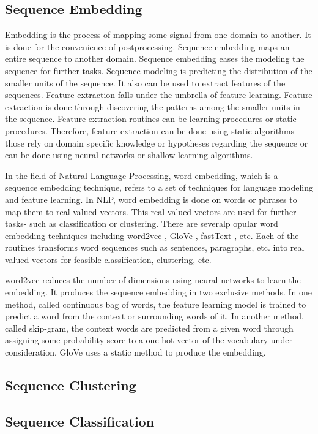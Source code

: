 \documentclass[oneside, twocolumn, a4paper, 10pt]{IEEEtran}
\begin{document}
\subsection{Sequence Embedding}
Embedding is the process of mapping some signal from one domain to another. It is done for the convenience of postprocessing. Sequence embedding maps an entire sequence to another domain. Sequence embedding eases the modeling the sequence for further tasks. Sequence modeling is predicting the distribution of the smaller units of the sequence. It also can be used to extract features of the sequences. Feature extraction falls under the umbrella of feature learning. Feature extraction is done through discovering the patterns among the smaller units in the sequence. Feature extraction routines can be learning procedures or static procedures. Therefore, feature extraction can be done using static algorithms those rely on domain specific knowledge or hypotheses regarding the sequence or can be done using neural networks or shallow learning algorithms.\\
\par 
In the field of Natural Language Processing, word embedding, which is a sequence embedding technique, refers to a set of techniques for language modeling and feature learning. In NLP, word embedding is done on words or phrases to map them to real valued vectors. This real-valued vectors are used for further tasks- such as classification or clustering. There are severalp opular word embedding techniques including word2vec \cite{17}, GloVe \cite{18}, fastText \cite{19} \cite{20}, etc. Each of the routines transforms word sequences such as sentences, paragraphs, etc. into real valued vectors for feasible classification, clustering, etc.\\
\par 
word2vec reduces the number of dimensions using neural networks to learn the embedding. It produces the sequence embedding in two exclusive methods. In one method, called continuous bag of words, the feature learning model is trained to predict a word from the context or surrounding words of it. In another method, called skip-gram, the context words are predicted from a given word through assigning some probability score to a one hot vector of the vocabulary under consideration. GloVe uses a static method to produce the embedding. 
\subsection{Sequence Clustering}
\subsection{Sequence Classification}
\end{document}
